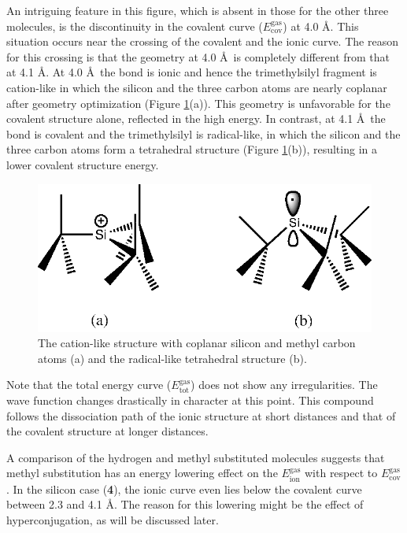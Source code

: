 An intriguing feature in this figure, which is absent in those for the other three molecules, is the discontinuity in the covalent curve ($E_\mathrm{cov}^\mathrm{gas}$) at 4.0 \AA. This situation occurs near the crossing of the covalent and the ionic curve. The reason for this crossing is that the geometry at 4.0 \AA\ is completely different from that at 4.1 \AA. At 4.0 \AA\ the bond is ionic and hence the trimethylsilyl fragment is cation-like in which the silicon and the three carbon atoms are nearly coplanar after geometry optimization (Figure \ref{ch3.fig.crossing}(a)). This geometry is unfavorable for the covalent structure alone, reflected in the high energy.  In contrast, at 4.1 \AA\  the bond is covalent and the trimethylsilyl is radical-like, in which the silicon and the three carbon atoms form a tetrahedral structure (Figure \ref{ch3.fig.crossing}(b)), resulting in a lower covalent structure energy. 
\begin{figure}[htbp]
\center
\includegraphics[scale=1.0]{dissociation/figures/crossing.eps}
\caption{The cation-like structure with coplanar silicon and methyl carbon atoms (a) and the radical-like tetrahedral structure (b).}
\label{ch3.fig.crossing}
\end{figure}
Note that the total energy curve ($E_\mathrm{tot}^\mathrm{gas}$) does not show any irregularities.  The wave function changes drastically in character at this point. This compound follows the dissociation path of the ionic structure at short distances and that of the covalent structure at longer distances. 

A comparison of the hydrogen and methyl substituted molecules suggests that methyl substitution has an energy lowering effect on the $E_\mathrm{ion}^\mathrm{gas}$ with respect to $E_\mathrm{cov}^\mathrm{gas}$. In the silicon case (\textbf{4}), the ionic curve even lies below the covalent curve between 2.3 and 4.1 \AA. The reason for this lowering might be the effect of hyperconjugation, as will be discussed later.

